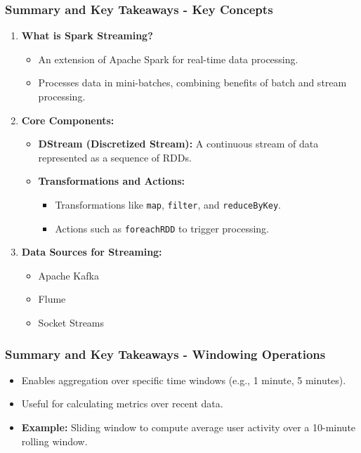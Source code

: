 \documentclass[aspectratio=169]{beamer}
\begin{document}
\begin{frame}
    \frametitle{Summary and Key Takeaways - Key Concepts}
    \begin{enumerate}
        \item \textbf{What is Spark Streaming?}
        \begin{itemize}
            \item An extension of Apache Spark for real-time data processing.
            \item Processes data in mini-batches, combining benefits of batch and stream processing.
        \end{itemize}

        \item \textbf{Core Components:}
        \begin{itemize}
            \item \textbf{DStream (Discretized Stream):} A continuous stream of data represented as a sequence of RDDs. 
            \item \textbf{Transformations and Actions:} 
            \begin{itemize}
                \item Transformations like \texttt{map}, \texttt{filter}, and \texttt{reduceByKey}.
                \item Actions such as \texttt{foreachRDD} to trigger processing.
            \end{itemize}
        \end{itemize}
        
        \item \textbf{Data Sources for Streaming:} 
        \begin{itemize}
            \item Apache Kafka
            \item Flume
            \item Socket Streams
        \end{itemize}
    \end{enumerate}
\end{frame}

\begin{frame}
    \frametitle{Summary and Key Takeaways - Windowing Operations}
    \begin{itemize}
        \item Enables aggregation over specific time windows (e.g., 1 minute, 5 minutes).
        \item Useful for calculating metrics over recent data.
        \item \textbf{Example:} Sliding window to compute average user activity over a 10-minute rolling window.
    \end{itemize}
\end{frame}
\end{document}
